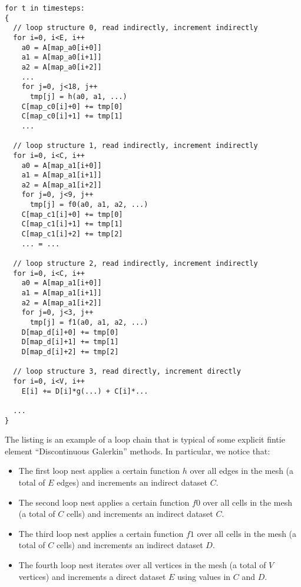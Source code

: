 \documentclass[a4paper]{article}
\begin{document}

\begin{footnotesize}
\begin{lstlisting}
for t in timesteps:
{
  // loop structure 0, read indirectly, increment indirectly
  for i=0, i<E, i++
    a0 = A[map_a0[i+0]]
    a1 = A[map_a0[i+1]]
    a2 = A[map_a0[i+2]]
    ...
    for j=0, j<18, j++
      tmp[j] = h(a0, a1, ...)
    C[map_c0[i]+0] += tmp[0]
    C[map_c0[i]+1] += tmp[1]
    ...

  // loop structure 1, read indirectly, increment indirectly
  for i=0, i<C, i++
    a0 = A[map_a1[i+0]]
    a1 = A[map_a1[i+1]]
    a2 = A[map_a1[i+2]]
    for j=0, j<9, j++
      tmp[j] = f0(a0, a1, a2, ...)
    C[map_c1[i]+0] += tmp[0]
    C[map_c1[i]+1] += tmp[1]
    C[map_c1[i]+2] += tmp[2]
    ... = ...

  // loop structure 2, read indirectly, increment indirectly
  for i=0, i<C, i++
    a0 = A[map_a1[i+0]]
    a1 = A[map_a1[i+1]]
    a2 = A[map_a1[i+2]]
    for j=0, j<3, j++
      tmp[j] = f1(a0, a1, a2, ...)
    D[map_d[i]+0] += tmp[0]
    D[map_d[i]+1] += tmp[1]
    D[map_d[i]+2] += tmp[2]
          
  // loop structure 3, read directly, increment directly
  for i=0, i<V, i++
    E[i] += D[i]*g(...) + C[i]*...

  ...
}
\end{lstlisting}
\end{footnotesize}

The listing is an example of a loop chain that is typical of some explicit fintie element ``Discontinuous Galerkin'' methods. In particular, we notice that:
\begin{itemize}
\item The first loop nest applies a certain function $h$ over all edges in the mesh (a total of $E$ edges) and increments an indirect dataset $C$.
\item The second loop nest applies a certain function $f0$ over all cells in the mesh (a total of $C$ cells) and increments an indirect dataset $C$.
\item The third loop nest applies a certain function $f1$ over all cells in the mesh (a total of $C$ cells) and increments an indirect dataset $D$.
\item The fourth loop nest iterates over all vertices in the mesh (a total of $V$ vertices) and increments a direct dataset $E$ using values in $C$ and $D$.
\end{itemize}
\end{document}

